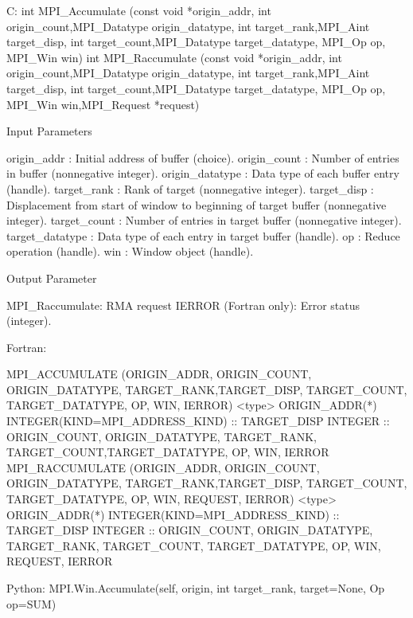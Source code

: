 C:
int MPI_Accumulate
   (const void *origin_addr, int origin_count,MPI_Datatype origin_datatype,
    int target_rank,MPI_Aint target_disp, int target_count,MPI_Datatype target_datatype,
    MPI_Op op, MPI_Win win)
int MPI_Raccumulate
   (const void *origin_addr, int origin_count,MPI_Datatype origin_datatype, 
    int target_rank,MPI_Aint target_disp, int target_count,MPI_Datatype target_datatype, 
    MPI_Op op, MPI_Win win,MPI_Request *request)

Input Parameters

origin_addr : Initial address of buffer (choice).
origin_count : Number of entries in buffer (nonnegative integer).
origin_datatype : Data type of each buffer entry (handle).
target_rank : Rank of target (nonnegative integer).
target_disp : Displacement from start of window to beginning of target buffer (nonnegative integer).
target_count : Number of entries in target buffer (nonnegative integer).
target_datatype : Data type of each entry in target buffer (handle).
op : Reduce operation (handle).
win : Window object (handle).

Output Parameter

MPI_Raccumulate: RMA request
IERROR (Fortran only): Error status (integer).

Fortran:

MPI_ACCUMULATE
   (ORIGIN_ADDR, ORIGIN_COUNT, ORIGIN_DATATYPE,
    TARGET_RANK,TARGET_DISP, TARGET_COUNT, TARGET_DATATYPE, 
    OP, WIN, IERROR)
<type> ORIGIN_ADDR(*)
INTEGER(KIND=MPI_ADDRESS_KIND) :: TARGET_DISP
INTEGER :: ORIGIN_COUNT, ORIGIN_DATATYPE, 
           TARGET_RANK, TARGET_COUNT,TARGET_DATATYPE, 
           OP, WIN, IERROR
MPI_RACCUMULATE
   (ORIGIN_ADDR, ORIGIN_COUNT, ORIGIN_DATATYPE,
    TARGET_RANK,TARGET_DISP, TARGET_COUNT, TARGET_DATATYPE, 
    OP, WIN, REQUEST, IERROR)
<type> ORIGIN_ADDR(*)
INTEGER(KIND=MPI_ADDRESS_KIND) :: TARGET_DISP
INTEGER :: ORIGIN_COUNT, ORIGIN_DATATYPE, TARGET_RANK, TARGET_COUNT, TARGET_DATATYPE,
           OP, WIN, REQUEST, IERROR

Python:
MPI.Win.Accumulate(self, origin, int target_rank, target=None, Op op=SUM)
